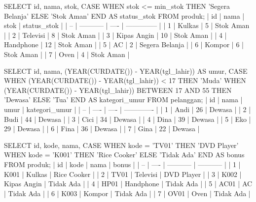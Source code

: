 SELECT id, nama, stok,
       CASE
           WHEN stok <= min_stok THEN 'Segera Belanja'
           ELSE 'Stok Aman'
       END AS status_stok
FROM produk;
| id | nama        | stok | status_stok    |
| -- | ----------- | ---- | -------------- |
| 1  | Kulkas      | 5    | Stok Aman      |
| 2  | Televisi    | 8    | Stok Aman      |
| 3  | Kipas Angin | 10   | Stok Aman      |
| 4  | Handphone   | 12   | Stok Aman      |
| 5  | AC          | 2    | Segera Belanja |
| 6  | Kompor      | 6    | Stok Aman      |
| 7  | Oven        | 4    | Stok Aman      |

SELECT id, nama, (YEAR(CURDATE()) - YEAR(tgl_lahir)) AS umur,
       CASE
           WHEN (YEAR(CURDATE()) - YEAR(tgl_lahir)) < 17 THEN 'Muda'
           WHEN (YEAR(CURDATE()) - YEAR(tgl_lahir)) BETWEEN 17 AND 55 THEN 'Dewasa'
           ELSE 'Tua'
       END AS kategori_umur
FROM pelanggan;
| id | nama | umur | kategori_umur |
| -- | ---- | ---- | ------------- |
| 1  | Andi | 26   | Dewasa        |
| 2  | Budi | 44   | Dewasa        |
| 3  | Cici | 34   | Dewasa        |
| 4  | Dina | 39   | Dewasa        |
| 5  | Eko  | 29   | Dewasa        |
| 6  | Fina | 36   | Dewasa        |
| 7  | Gina | 22   | Dewasa        |

SELECT id, kode, nama,
       CASE
           WHEN kode = 'TV01' THEN 'DVD Player'
           WHEN kode = 'K001' THEN 'Rice Cooker'
           ELSE 'Tidak Ada'
       END AS bonus
FROM produk;
| id | kode | nama        | bonus       |
| -- | ---- | ----------- | ----------- |
| 1  | K001 | Kulkas      | Rice Cooker |
| 2  | TV01 | Televisi    | DVD Player  |
| 3  | K002 | Kipas Angin | Tidak Ada   |
| 4  | HP01 | Handphone   | Tidak Ada   |
| 5  | AC01 | AC          | Tidak Ada   |
| 6  | K003 | Kompor      | Tidak Ada   |
| 7  | OV01 | Oven        | Tidak Ada   |
